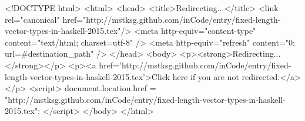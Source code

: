 <!DOCTYPE html>
<html>
<head>
<title>Redirecting...</title>
<link rel="canonical" href="http://mstksg.github.com/inCode/entry/fixed-length-vector-types-in-haskell-2015.tex"/>
<meta http-equiv="content-type" content="text/html; charset=utf-8" />
<meta http-equiv="refresh" content="0; url=#{destination_path}" />
</head>
<body>
  <p><strong>Redirecting...</strong></p>
  <p><a href='http://mstksg.github.com/inCode/entry/fixed-length-vector-types-in-haskell-2015.tex'>Click here if you are not redirected.</a></p>
  <script>
    document.location.href = "http://mstksg.github.com/inCode/entry/fixed-length-vector-types-in-haskell-2015.tex";
  </script>
</body>
</html>
